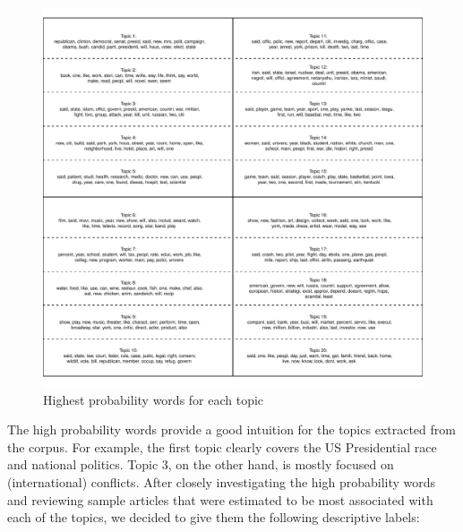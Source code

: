 \documentclass[12pt]{article}
\begin{document}
\begin{doublespace}
\begin{figure}[ht]
\caption{Highest probability words for each topic}\label{fig:words}
\includegraphics[width=\textwidth]{../calc/fig/words}
\end{figure}

The high probability words provide a good intuition for the topics extracted from the corpus. For example, the first topic clearly covers the US Presidential race and national politics. Topic 3, on the other hand, is mostly focused on (international) conflicts. After closely investigating the high probability words and reviewing sample articles that were estimated to be most associated with each of the topics, we decided to give them the following descriptive labels:


\end{doublespace}
\end{document}
